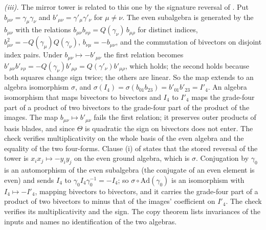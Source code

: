 \emph{(iii).} The mirror tower is related to this one by the signature reversal of . Put $b_{\mu\nu} = \gamma_{\mu}\gamma_{\nu}$ and $b'_{\mu\nu} = \gamma'_{\mu}\gamma'_{\nu}$ for $\mu \neq \nu$. The even subalgebra is generated by the $b_{\mu\nu}$ with the relations $b_{\mu\nu}b_{\nu\rho} = Q(\gamma_{\nu})\,b_{\mu\rho}$ for distinct indices, $b_{\mu\nu}^{2} = -Q(\gamma_{\mu})Q(\gamma_{\nu})$, $b_{\nu\mu} = -b_{\mu\nu}$, and the commutation of bivectors on disjoint index pairs. Under $b_{\mu\nu} \mapsto -b'_{\mu\nu}$ the first relation becomes $b'_{\mu\nu}b'_{\nu\rho} = -Q(\gamma_{\nu})b'_{\mu\rho} = Q(\gamma'_{\nu})b'_{\mu\rho}$, which holds; the second holds because both squares change sign twice; the others are linear. So the map extends to an algebra isomorphism $\sigma$, and $\sigma(I_{4}) = \sigma(b_{01}b_{23}) = b'_{01}b'_{23} = I'_{4}$. An algebra isomorphism that maps bivectors to bivectors and $I_{4}$ to $I'_{4}$ maps the grade-four part of a product of two bivectors to the grade-four part of the product of the images. The map $b_{\mu\nu} \mapsto b'_{\mu\nu}$ fails the first relation; it preserves outer products of basis blades, and since $\Theta$ is quadratic the sign on bivectors does not enter. The check verifies multiplicativity on the whole basis of the even algebra and the equality of the two four-forms. Clause (i) of  states that the stored reversal of the tower is $x_{i}x_{j} \mapsto -y_{i}y_{j}$ on the even ground algebra, which is $\sigma$. Conjugation by $\gamma_{0}$ is an automorphism of the even subalgebra (the conjugate of an even element is even) and sends $I_{4}$ to $\gamma_{0}I_{4}\gamma_{0}^{-1} = -I_{4}$; so $\sigma \circ \mathrm{Ad}(\gamma_{0})$ is an isomorphism with $I_{4} \mapsto -I'_{4}$, mapping bivectors to bivectors, and it carries the grade-four part of a product of two bivectors to minus that of the images' coefficient on $I'_{4}$. The check verifies its multiplicativity and the sign. The copy theorem lists invariances of the inputs and names no identification of the two algebras.

